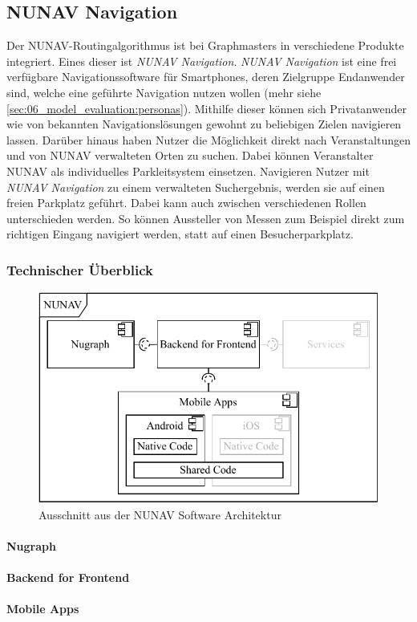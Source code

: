 \subsection{NUNAV Navigation}

Der NUNAV-Routingalgorithmus ist bei Graphmasters in verschiedene Produkte integriert. Eines dieser ist \textit{NUNAV Navigation}. \textit{NUNAV Navigation} ist eine frei verfügbare Navigationssoftware für Smartphones, deren Zielgruppe Endanwender sind, welche eine geführte Navigation nutzen wollen (mehr siehe \autoref{sec:06_model_evaluation:personas}). Mithilfe dieser können sich Privatanwender wie von bekannten Navigationslösungen gewohnt zu beliebigen Zielen navigieren lassen. Darüber hinaus haben Nutzer die Möglichkeit direkt nach Veranstaltungen und von NUNAV verwalteten Orten zu suchen. Dabei können Veranstalter NUNAV als individuelles Parkleitsystem einsetzen. Navigieren Nutzer mit \textit{NUNAV Navigation} zu einem verwalteten Suchergebnis, werden sie auf einen freien Parkplatz geführt. Dabei kann auch zwischen verschiedenen Rollen unterschieden werden. So können Aussteller von Messen zum Beispiel direkt zum richtigen Eingang navigiert werden, statt auf einen Besucherparkplatz.

\subsubsection{Technischer Überblick}

\begin{figure}[htb!]
    \centering
    \includegraphics{contents/06_model_evaluation/01_integration/res/nunav_architecture.pdf}
    \caption{Ausschnitt aus der NUNAV Software Architektur}
    \label{fig:nunav_software_architecture}
\end{figure}

\paragraph{Nugraph}

\paragraph{Backend for Frontend}

\paragraph{Mobile Apps}